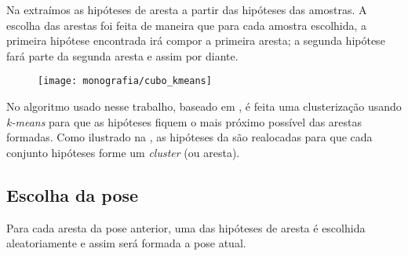 Na  extraímos as hipóteses de aresta a partir das hipóteses das amostras. A escolha das arestas foi feita de maneira que para cada amostra escolhida, a primeira hipótese encontrada irá compor a primeira aresta; a segunda hipótese fará parte da segunda aresta e assim por diante.

\begin{figure}[ht!]
\centering
\texttt{[image: monografia/cubo\_kmeans]}
\caption{}
\label{cubo_kmeans}
\end{figure}

No algoritmo usado nesse trabalho, baseado em \cite{celine}, é feita uma clusterização usando \emph{k-means} para que as hipóteses fiquem o mais próximo possível das arestas formadas. Como ilustrado na , as hipóteses da  são realocadas para que cada conjunto hipóteses forme um \emph{cluster} (ou aresta).

\subsection{Escolha da pose}

Para cada aresta da pose anterior, uma das hipóteses de aresta é escolhida aleatoriamente e assim será formada a pose atual.

\begin{comment}
\subsection{A FAZER}

\begin{enumerate}
\item Descrever o moving-edges. Mostrar que com múltiplas hipóteses a $n$-ésima hipótese de ponto vai corresponder à $n$-ésima hipótese de aresta.
\item Falar sobre \cite{celine}. As hipóteses de pontos vão formar arestas tal que elas fiquem as mais paralelas possíveis da aresta da cena atual.
\item colocar figuras para ilustrar
\end{enumerate}
\end{comment}
